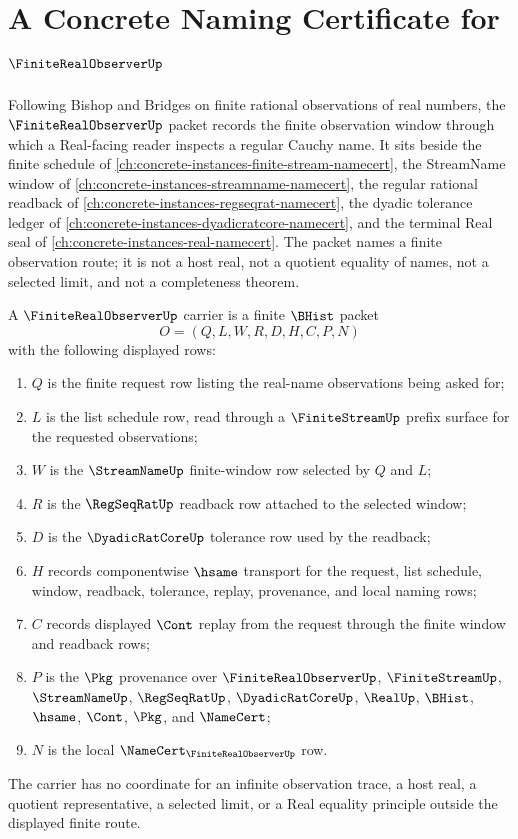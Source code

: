 \chapter{A Concrete Naming Certificate for $\FiniteRealObserverUp$}
\label{ch:concrete-instances-finite-real-observer-namecert}

Following Bishop and Bridges on finite rational observations of real numbers, the $\FiniteRealObserverUp$ packet records the finite observation window through which a Real-facing reader inspects a regular Cauchy name. It sits beside the finite schedule of \autoref{ch:concrete-instances-finite-stream-namecert}, the StreamName window of \autoref{ch:concrete-instances-streamname-namecert}, the regular rational readback of \autoref{ch:concrete-instances-regseqrat-namecert}, the dyadic tolerance ledger of \autoref{ch:concrete-instances-dyadicratcore-namecert}, and the terminal Real seal of \autoref{ch:concrete-instances-real-namecert}. The packet names a finite observation route; it is not a host real, not a quotient equality of names, not a selected limit, and not a completeness theorem.

\begin{definition}
\label{def:finite-real-observer-carrier}
A $\FiniteRealObserverUp$ carrier is a finite $\BHist$ packet
$$
O=(Q,L,W,R,D,H,C,P,N)
$$
with the following displayed rows:
\begin{enumerate}
\item $Q$ is the finite request row listing the real-name observations being asked for;
\item $L$ is the list schedule row, read through a $\FiniteStreamUp$ prefix surface for the requested observations;
\item $W$ is the $\StreamNameUp$ finite-window row selected by $Q$ and $L$;
\item $R$ is the $\RegSeqRatUp$ readback row attached to the selected window;
\item $D$ is the $\DyadicRatCoreUp$ tolerance row used by the readback;
\item $H$ records componentwise $\hsame$ transport for the request, list schedule, window, readback, tolerance, replay, provenance, and local naming rows;
\item $C$ records displayed $\Cont$ replay from the request through the finite window and readback rows;
\item $P$ is the $\Pkg$ provenance over $\FiniteRealObserverUp$, $\FiniteStreamUp$, $\StreamNameUp$, $\RegSeqRatUp$, $\DyadicRatCoreUp$, $\RealUp$, $\BHist$, $\hsame$, $\Cont$, $\Pkg$, and $\NameCert$;
\item $N$ is the local $\NameCert_{\FiniteRealObserverUp}$ row.
\end{enumerate}
The carrier has no coordinate for an infinite observation trace, a host real, a quotient representative, a selected limit, or a Real equality principle outside the displayed finite route.
\end{definition}

